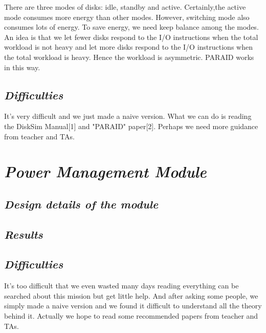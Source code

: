 \documentclass[conference]{IEEEtran}
\begin{document}
There are three modes of disks: idle, standby and active. Certainly,the active mode consumes more energy than other modes. However, switching mode also consumes lots of energy. To save energy, we need keep balance among the modes.\\

An idea is that we let fewer disks respond to the I/O instructions when the total workload is not heavy and let more disks respond to the I/O instructions when the total workload is heavy. Hence the workload is asymmetric. PARAID works in this way.\\
\subsection{\emph{\textbf{Difficulties}}}
It's very difficult and we just made a naive version. What we can do is reading the DiskSim Manual[1] and "PARAID" paper[2]. Perhaps we need more guidance from teacher and TAs.

\section{\emph{\textbf{Power Management Module}}}
\subsection{\emph{\textbf{Design details of the module}}}
\subsection{\emph{\textbf{Results}}}
\subsection{\emph{\textbf{Difficulties}}}
It's too difficult that we even wasted many days reading everything can be searched about this mission but get little help. And after asking some people, we simply made a naive version and we found it difficult to understand all the theory behind it. Actually we hope to read some recommended papers from teacher and TAs. 


\end{document}

